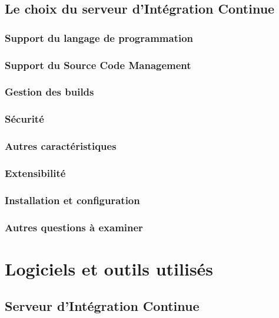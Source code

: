 \documentclass{report}
\begin{document}
        \subsection{Le choix du serveur d’Intégration Continue}
          \subsubsection{Support du langage de programmation}

          \subsubsection{Support du Source Code Management}

          \subsubsection{Gestion des builds}

          \subsubsection{Sécurité}

          \subsubsection{Autres caractéristiques}

          \subsubsection{Extensibilité}

          \subsubsection{Installation et configuration}

          \subsubsection{Autres questions à examiner}

      \section{Logiciels et outils utilisés}

        \subsection{Serveur d’Intégration Continue}
\end{document}

